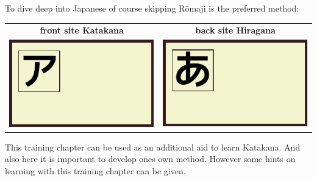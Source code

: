 To dive deep into Japanese of course skipping Rōmaji is the preferred method:

\begin{center}
\begin{tabular}{cc}
\textbf{front site Katakana}&\textbf{back site Hiragana}\\
\includegraphics[scale=1.5]{../share/i/fcak.pdf}%
&
\includegraphics[scale=1.5]{../share/i/fcah.pdf}%
\\
\end{tabular}
\end{center}

This training chapter can be used as an additional aid to learn Katakana. And
also here it is important to develop ones own method. However some hints on
learning with this training chapter can be given.

